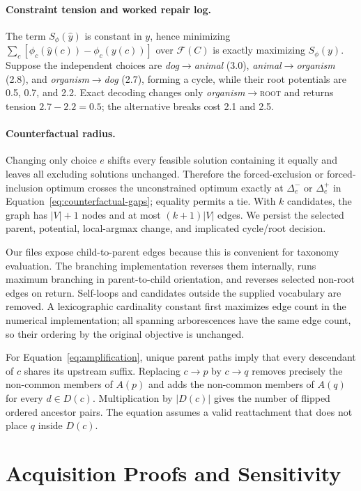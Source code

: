 \documentclass[11pt]{article}
\newcommand{\rootnode}{\textsc{root}}
\begin{document}
\paragraph{Constraint tension and worked repair log.}
The term $S_\phi(\hat y)$ is constant in $y$, hence minimizing
$\sum_c[\phi_c(\hat y(c))-\phi_c(y(c))]$ over $\mathcal F(C)$ is exactly
maximizing $S_\phi(y)$. Suppose the independent choices are
\emph{dog}$\rightarrow$\emph{animal} (3.0),
\emph{animal}$\rightarrow$\emph{organism} (2.8), and
\emph{organism}$\rightarrow$\emph{dog} (2.7), forming a cycle, while their
root potentials are 0.5, 0.7, and 2.2. Exact decoding changes only
\emph{organism}$\rightarrow$\rootnode{} and returns tension $2.7-2.2=0.5$;
the alternative breaks cost 2.1 and 2.5.

\paragraph{Counterfactual radius.}
Changing only choice $e$ shifts every feasible solution containing it equally
and leaves all excluding solutions unchanged. Therefore the forced-exclusion
or forced-inclusion optimum crosses the unconstrained optimum exactly at
$\Delta_e^-$ or $\Delta_e^+$ in Equation~\ref{eq:counterfactual-gaps}; equality
permits a tie. With $k$ candidates, the graph has $|V|+1$ nodes and at most
$(k+1)|V|$ edges. We persist the selected parent, potential, local-argmax
change, and implicated cycle/root decision.

Our files expose child-to-parent edges because this is convenient for taxonomy
evaluation.  The branching implementation reverses them internally, runs
maximum branching in parent-to-child orientation, and reverses selected
non-root edges on return.  Self-loops and candidates outside the supplied
vocabulary are removed.  A lexicographic cardinality constant first maximizes
edge count in the numerical implementation; all spanning arborescences have
the same edge count, so their ordering by the original objective is unchanged.

For Equation~\ref{eq:amplification}, unique parent paths imply that every
descendant of $c$ shares its upstream suffix.  Replacing $c\rightarrow p$ by
$c\rightarrow q$ removes precisely the non-common members of $A(p)$ and adds
the non-common members of $A(q)$ for every $d\in D(c)$.  Multiplication by
$|D(c)|$ gives the number of flipped ordered ancestor pairs.  The equation
assumes a valid reattachment that does not place $q$ inside $D(c)$.
\section{Acquisition Proofs and Sensitivity}
\label{app:acquisition-proofs}
\end{document}
